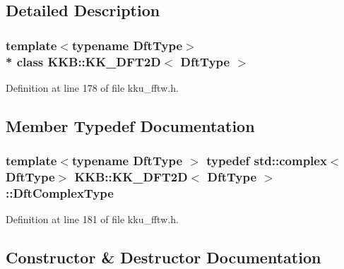 \subsection{Detailed Description}
\subsubsection*{template$<$typename Dft\+Type$>$\\*
class K\+K\+B\+::\+K\+K\+\_\+\+D\+F\+T2\+D$<$ Dft\+Type $>$}



Definition at line 178 of file kku\+\_\+fftw.\+h.



\subsection{Member Typedef Documentation}
\subsubsection[{\texorpdfstring{Dft\+Complex\+Type}{DftComplexType}}]{\setlength{\rightskip}{0pt plus 5cm}template$<$typename Dft\+Type $>$ typedef std\+::complex$<$Dft\+Type$>$ {\bf K\+K\+B\+::\+K\+K\+\_\+\+D\+F\+T2D}$<$ Dft\+Type $>$\+::{\bf Dft\+Complex\+Type}}\hypertarget{class_k_k_b_1_1_k_k___d_f_t2_d_a3277abaea54d0d88958f030092b9ac38}{}\label{class_k_k_b_1_1_k_k___d_f_t2_d_a3277abaea54d0d88958f030092b9ac38}


Definition at line 181 of file kku\+\_\+fftw.\+h.



\subsection{Constructor \& Destructor Documentation}
